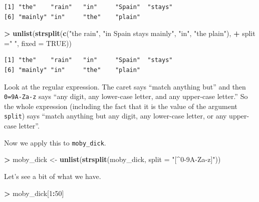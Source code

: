 \documentclass[
]{krantz}
\makeatletter
\newenvironment{Shaded}{\begin{snugshade}}{\end{snugshade}}
\newcommand{\DataTypeTok}[1]{\textcolor[rgb]{0.27,0.27,0.27}{#1}}
\newcommand{\DecValTok}[1]{\textcolor[rgb]{0.06,0.06,0.06}{#1}}
\newcommand{\KeywordTok}[1]{\textcolor[rgb]{0.27,0.27,0.27}{\textbf{#1}}}
\newcommand{\NormalTok}[1]{#1}
\newcommand{\OperatorTok}[1]{\textcolor[rgb]{0.43,0.43,0.43}{\textbf{#1}}}
\newcommand{\OtherTok}[1]{\textcolor[rgb]{0.37,0.37,0.37}{#1}}
\newcommand{\StringTok}[1]{\textcolor[rgb]{0.5,0.5,0.5}{#1}}
\newenvironment{kframe}{%
\medskip{}
\setlength{\fboxsep}{.8em}
 \def\at@end@of@kframe{}%
 \ifinner\ifhmode%
  \def\at@end@of@kframe{\end{minipage}}%
  \begin{minipage}{\columnwidth}%
 \fi\fi%
 \def\FrameCommand##1{\hskip\@totalleftmargin \hskip-\fboxsep
 \colorbox{shadecolor}{##1}\hskip-\fboxsep
     \hskip-\linewidth \hskip-\@totalleftmargin \hskip\columnwidth}%
 \MakeFramed {\advance\hsize-\width
   \@totalleftmargin\z@ \linewidth\hsize
   \@setminipage}}%
 {\par\unskip\endMakeFramed%
 \at@end@of@kframe}
\renewenvironment{Shaded}{\begin{kframe}}{\end{kframe}}
\makeatother
\begin{document}
\begin{verbatim}
[1] "the"    "rain"   "in"     "Spain"  "stays" 
[6] "mainly" "in"     "the"    "plain" 
\end{verbatim}

\begin{Shaded}
\begin{Highlighting}[]
\OperatorTok{\textgreater{}}\StringTok{ }\KeywordTok{unlist}\NormalTok{(}\KeywordTok{strsplit}\NormalTok{(}\KeywordTok{c}\NormalTok{(}\StringTok{"the rain"}\NormalTok{, }\StringTok{"in Spain stays mainly"}\NormalTok{, }\StringTok{"in"}\NormalTok{, }\StringTok{"the plain"}\NormalTok{), }
\OperatorTok{+}\StringTok{                 }\DataTypeTok{split =}\StringTok{" "}\NormalTok{, }\DataTypeTok{fixed =} \OtherTok{TRUE}\NormalTok{))}
\end{Highlighting}
\end{Shaded}

\begin{verbatim}
[1] "the"    "rain"   "in"     "Spain"  "stays" 
[6] "mainly" "in"     "the"    "plain" 
\end{verbatim}

Look at the regular expression. The caret says ``match anything but'' and then \texttt{0=9A-Za-z} says ``any digit, any lower-case letter, and any upper-case letter.'' So the whole expression (including the fact that it is the value of the argument \texttt{split}) says ``match anything but any digit, any lower-case letter, or any upper-case letter''.

Now we apply this to \texttt{moby\_dick}.

\begin{Shaded}
\begin{Highlighting}[]
\OperatorTok{\textgreater{}}\StringTok{ }\NormalTok{moby\_dick \textless{}{-}}\StringTok{ }\KeywordTok{unlist}\NormalTok{(}\KeywordTok{strsplit}\NormalTok{(moby\_dick, }\DataTypeTok{split =} \StringTok{"[\^{}0{-}9A{-}Za{-}z]"}\NormalTok{))}
\end{Highlighting}
\end{Shaded}

Let's see a bit of what we have.

\begin{Shaded}
\begin{Highlighting}[]
\OperatorTok{\textgreater{}}\StringTok{ }\NormalTok{moby\_dick[}\DecValTok{1}\OperatorTok{:}\DecValTok{50}\NormalTok{]}
\end{Highlighting}
\end{Shaded}
\end{document}
